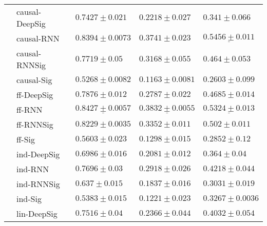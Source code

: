 \begin{tabular}{lllll}
       & causal-DeepSig &                            $ 0.7427 \pm 0.021 $ &                            $ 0.2218 \pm 0.027 $ &                            $ 0.341 \pm 0.066 $ \\
       & causal-RNN &               $  \mathbf{ 0.8394 \pm 0.0073 } $ &                $  \mathbf{ 0.3741 \pm 0.023 } $ &  $  \mathbf{ \underline{ 0.5456 \pm 0.011 }} $ \\
       & causal-RNNSig &                             $ 0.7719 \pm 0.05 $ &                            $ 0.3168 \pm 0.055 $ &                            $ 0.464 \pm 0.053 $ \\
       & causal-Sig &                           $ 0.5268 \pm 0.0082 $ &                           $ 0.1163 \pm 0.0081 $ &                           $ 0.2603 \pm 0.099 $ \\
       & ff-DeepSig &                            $ 0.7876 \pm 0.012 $ &                            $ 0.2787 \pm 0.022 $ &                           $ 0.4685 \pm 0.014 $ \\
       & ff-RNN &  $  \mathbf{ \underline{ 0.8427 \pm 0.0057 }} $ &  $  \mathbf{ \underline{ 0.3832 \pm 0.0055 }} $ &            $  \underline{ 0.5324 \pm 0.013 } $ \\
       & ff-RNNSig &                           $ 0.8229 \pm 0.0035 $ &                            $ 0.3352 \pm 0.011 $ &                            $ 0.502 \pm 0.011 $ \\
       & ff-Sig &                            $ 0.5603 \pm 0.023 $ &                            $ 0.1298 \pm 0.015 $ &                            $ 0.2852 \pm 0.12 $ \\
       & ind-DeepSig &                            $ 0.6986 \pm 0.016 $ &                            $ 0.2081 \pm 0.012 $ &                             $ 0.364 \pm 0.04 $ \\
       & ind-RNN &                             $ 0.7696 \pm 0.03 $ &                            $ 0.2918 \pm 0.026 $ &                           $ 0.4218 \pm 0.044 $ \\
       & ind-RNNSig &                             $ 0.637 \pm 0.015 $ &                            $ 0.1837 \pm 0.016 $ &                           $ 0.3031 \pm 0.019 $ \\
       & ind-Sig &                            $ 0.5383 \pm 0.015 $ &                            $ 0.1221 \pm 0.023 $ &                          $ 0.3267 \pm 0.0036 $ \\
       & lin-DeepSig &                             $ 0.7516 \pm 0.04 $ &                            $ 0.2366 \pm 0.044 $ &                           $ 0.4032 \pm 0.054 $ \\

\end{tabular}
